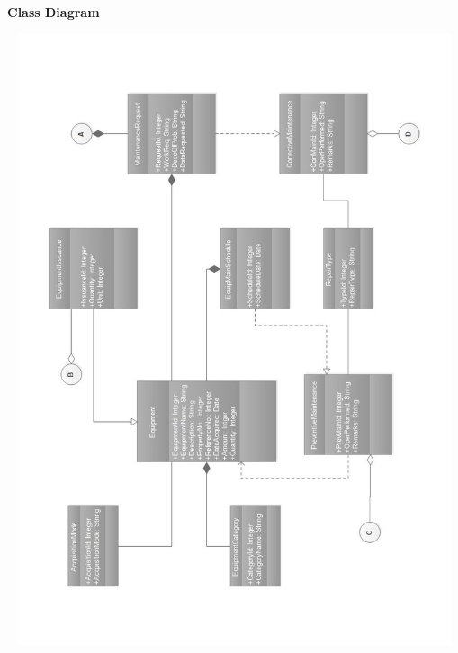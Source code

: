 \begin{center} 
	\textbf{Class Diagram}
\end{center}
\begin{center}
	\includegraphics[width=14cm,height=18cm]{image/f1.jpg}

\end{center}
